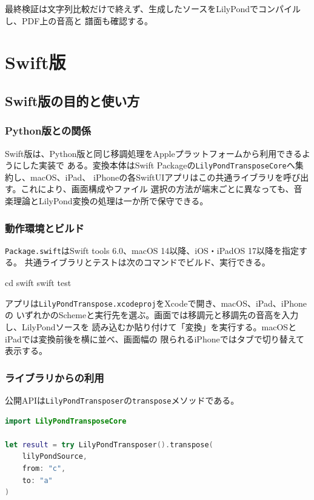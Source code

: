 \documentclass[uplatex,a4paper,11pt]{jsbook}
\begin{document}
最終検証は文字列比較だけで終えず、生成したソースをLilyPondでコンパイルし、PDF上の音高と
譜面も確認する。

\part{Swift版}

\chapter{Swift版の目的と使い方}

\section{Python版との関係}

Swift版は、Python版と同じ移調処理をAppleプラットフォームから利用できるようにした実装で
ある。変換本体はSwift Packageの\texttt{LilyPondTransposeCore}へ集約し、macOS、iPad、
iPhoneの各SwiftUIアプリはこの共通ライブラリを呼び出す。これにより、画面構成やファイル
選択の方法が端末ごとに異なっても、音楽理論とLilyPond変換の処理は一か所で保守できる。

\section{動作環境とビルド}

\texttt{Package.swift}はSwift tools 6.0、macOS 14以降、iOS・iPadOS 17以降を指定する。
共通ライブラリとテストは次のコマンドでビルド、実行できる。

\begin{command}
cd swift
swift test
\end{command}

アプリは\texttt{LilyPondTranspose.xcodeproj}をXcodeで開き、macOS、iPad、iPhoneの
いずれかのSchemeと実行先を選ぶ。画面では移調元と移調先の音高を入力し、LilyPondソースを
読み込むか貼り付けて「変換」を実行する。macOSとiPadでは変換前後を横に並べ、画面幅の
限られるiPhoneではタブで切り替えて表示する。

\section{ライブラリからの利用}

公開APIは\texttt{LilyPondTransposer}の\texttt{transpose}メソッドである。

\begin{lstlisting}[language=Swift,caption={Swift Packageからの呼出し例}]
import LilyPondTransposeCore

let result = try LilyPondTransposer().transpose(
    lilyPondSource,
    from: "c",
    to: "a"
)
\end{lstlisting}
\end{document}
